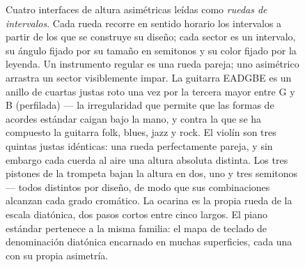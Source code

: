 \documentclass[10pt,letterpaper,twocolumn]{article}
\begin{document}
\begin{figure}[t]
{}
\endgroup
\caption{Cuatro interfaces de altura asimétricas leídas como \emph{ruedas de intervalos}. Cada rueda recorre en sentido horario los intervalos a partir de los que se construye su diseño; cada sector es un intervalo, su ángulo fijado por su tamaño en semitonos y su color fijado por la leyenda. Un instrumento regular es una rueda pareja; uno asimétrico arrastra un sector visiblemente impar. La guitarra EADGBE es un anillo de cuartas justas roto una vez por la tercera mayor entre G y B (perfilada) --- la irregularidad que permite que las formas de acordes estándar caigan bajo la mano, y contra la que se ha compuesto la guitarra folk, blues, jazz y rock. El violín son tres quintas justas idénticas: una rueda perfectamente pareja, y sin embargo cada cuerda al aire una altura absoluta distinta. Los tres pistones de la trompeta bajan la altura en dos, uno y tres semitonos --- todos distintos por diseño, de modo que sus combinaciones alcanzan cada grado cromático. La ocarina es la propia rueda de la escala diatónica, dos pasos cortos entre cinco largos. El piano estándar pertenece a la misma familia: el mapa de teclado de denominación diatónica encarnado en muchas superficies, cada una con su propia asimetría.}
\label{fig:asymmetric-instruments}
\end{figure}
\end{document}
